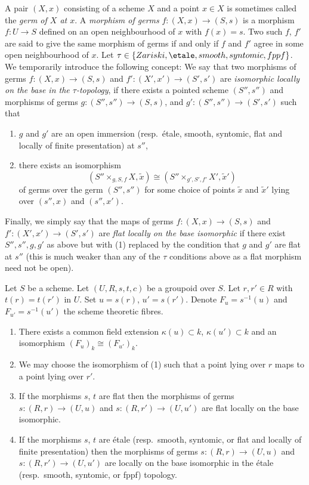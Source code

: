 \medskip\noindent
A pair $(X, x)$ consisting of a scheme $X$ and a point $x \in X$ is sometimes
called the {\it germ of $X$ at $x$}.
A {\it morphism of germs} $f : (X, x) \to (S, s)$
is a morphism $f : U \to S$ defined on an open neighbourhood
of $x$ with $f(x) = s$. Two such
$f$, $f'$ are said to give the same morphism of germs
if and only if $f$ and $f'$ agree in some open neighbourhood of $x$.
Let $\tau \in \{Zariski, \etale, smooth, syntomic, fppf\}$.
We temporarily introduce the following concept: We say that two morphisms
of germs $f : (X, x) \to (S, s)$ and $f' : (X', x') \to (S', s')$
are {\it isomorphic locally on the base in the $\tau$-topology},
if there exists a pointed scheme $(S'', s'')$ and morphisms of germs
$g : (S'', s'') \to (S, s)$, and $g' : (S'', s'') \to (S', s')$
such that
\begin{enumerate}
\item $g$ and $g'$ are an open immersion (resp.\ \'etale, smooth, syntomic,
flat and locally of finite presentation) at $s''$,
\item there exists an isomorphism
$$
(S'' \times_{g, S, f} X, \tilde x)
\cong
(S'' \times_{g', S', f'} X', \tilde  x')
$$
of germs over the germ $(S'', s'')$ for some choice of points
$\tilde x$ and $\tilde x'$ lying over $(s'', x)$ and $(s'', x')$.
\end{enumerate}
Finally, we simply say that the maps of germs
$f : (X, x) \to (S, s)$ and $f' : (X', x') \to (S', s')$
are {\it flat locally on the base isomorphic} if there exist
$S'', s'', g, g'$ as above but with (1) replaced by
the condition that $g$ and $g'$ are flat at $s''$ (this is
much weaker than any of the $\tau$ conditions above
as a flat morphism need not be open).

\begin{lemma}
\label{lemma-two-fibres}
Let $S$ be a scheme.
Let $(U, R, s, t, c)$ be a groupoid over $S$.
Let $r, r' \in R$ with $t(r) = t(r')$ in $U$.
Set $u = s(r)$, $u' = s(r')$.
Denote $F_u = s^{-1}(u)$ and $F_{u'} = s^{-1}(u')$ the scheme
theoretic fibres.
\begin{enumerate}
\item There exists a common field extension
$\kappa(u) \subset k$, $\kappa(u') \subset k$ and
an isomorphism $(F_u)_k \cong (F_{u'})_k$.
\item We may choose the isomorphism of (1) such that a point
lying over $r$ maps to a point lying over $r'$.
\item If the morphisms $s$, $t$ are flat then the morphisms of germs
$s : (R, r) \to (U, u)$ and $s : (R, r') \to (U, u')$ are flat
locally on the base isomorphic.
\item If the morphisms $s$, $t$ are \'etale
(resp.\ smooth, syntomic, or flat and locally of finite presentation)
then the morphisms of germs $s : (R, r) \to (U, u)$ and
$s : (R, r') \to (U, u')$ are locally on the base isomorphic
in the \'etale (resp.\ smooth, syntomic, or fppf) topology.
\end{enumerate}
\end{lemma}

